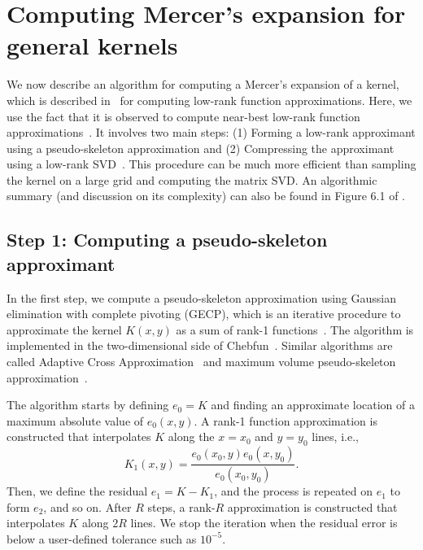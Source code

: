 \documentclass{article}
\begin{document}
\section{Computing Mercer's expansion for general kernels}\label{sec:numerical}

We now describe an algorithm for computing a Mercer's expansion of a kernel, which is described in~\citep{townsend2013extension} for computing low-rank function approximations. Here, we use the fact that it is observed to compute near-best low-rank function approximations~\citep{townsend2014computing}. It involves two main steps: (1) Forming a low-rank approximant using a pseudo-skeleton approximation and (2) Compressing the approximant using a low-rank SVD~\citep[Chapt.~1.1.4]{bebendorf2008hierarchical}. This procedure can be much more efficient than sampling the kernel on a large grid and computing the matrix SVD. An algorithmic summary (and discussion on its complexity) can also be found in Figure 6.1 of \citep{townsend2013extension}. 

\subsection{Step 1: Computing a pseudo-skeleton approximant}
In the first step, we compute a pseudo-skeleton approximation using Gaussian elimination with complete pivoting (GECP), which is an iterative procedure to approximate the kernel $K(x,y)$ as a sum of rank-1 functions~\citep{townsend2013extension}. The algorithm is implemented in the two-dimensional side of Chebfun~\citep{driscoll2014chebfun}. Similar algorithms are called Adaptive Cross Approximation~\citep{bebendorf2000approximation} and maximum volume pseudo-skeleton approximation~\citep{goreinov1997theory}. 

The algorithm starts by defining $e_0 = K$ and finding an approximate location of a maximum absolute value of $e_0(x, y)$. A rank-1  function approximation is constructed that interpolates $K$ along the $x=x_0$ and $y=y_0$ lines, i.e.,
\[
K_1(x, y) = \frac{e_0(x_0, y) e_0(x, y_0)}{e_0(x_0, y_0)}.
\]
Then, we define the residual $e_1 = K - K_1$, and the process is repeated on $e_1$ to form $e_2$, and so on. After $R$ steps, a rank-$R$ approximation is constructed that interpolates $K$ along $2R$ lines. We stop the iteration when the residual error is below a user-defined tolerance such as $10^{-5}$. 
\end{document}
